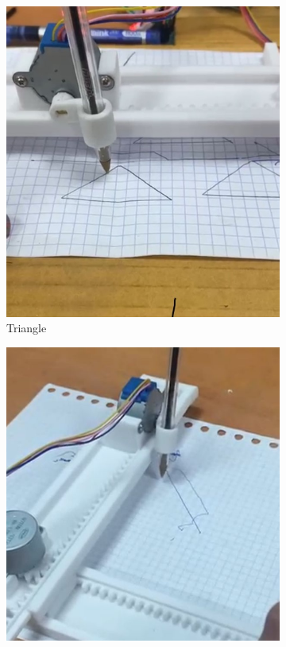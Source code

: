 \documentclass[12pt,a4paper]{article}
\begin{document}
\begin{figure}[h]
    \centering
    \begin{subfigure}{0.3\textwidth}
        \centering
        \includegraphics[width=\linewidth]{image1}
        \caption{Triangle}
    \end{subfigure}
    \hspace{0.05\textwidth}
    \begin{subfigure}{0.3\textwidth}
        \centering
        \includegraphics[width=\linewidth]{image2}

\end{subfigure}
\end{figure}
\end{document}

